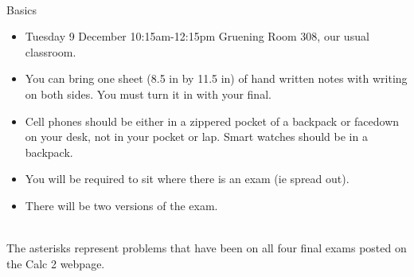 \documentclass[11pt,fleqn]{article}
\begin{document}
\renewcommand{\headrulewidth}{0pt}
\newcommand{\blank}[1]{\rule{#1}{0.75pt}}
\newcommand{\bc}{\begin{center}}
\newcommand{\ec}{\end{center}}
\renewcommand{\d}{\displaystyle}

\vspace*{-0.7in}

\begin{center}
  \large
  \\
   
\end{center}
{\Large{Basics}}\\

\begin{itemize}
\item Tuesday 9 December 10:15am-12:15pm Gruening Room 308, our usual classroom.
\item You can bring one sheet (8.5 in by 11.5 in) of hand written notes with writing on both sides. You must turn it in with your final.
\item Cell phones should be either in a zippered pocket of a backpack or facedown on your desk, not in your pocket or lap. Smart watches should be in a backpack.
\item You will be required to sit where there is an exam (ie spread out).
\item There will be two versions of the exam.\\
\end{itemize}

\\

The asterisks represent problems that have been on all four final exams posted on the Calc 2 webpage.
\end{document}
